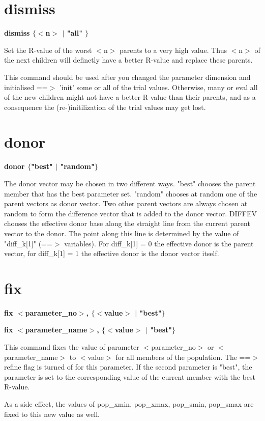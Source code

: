 \section{dismiss}
{\bf dismiss $ \{$$ <$n$> $ $| $ "all" $\} $ \par }
\par
\vspace{3pt}
Set the R-value of the worst $ <$n$> $ parents to a very high value. 
Thus $ <$n$> $ of the next children will definetly have a better R-value 
and replace these parents. 
\par
This command should be used after you changed the parameter dimension 
and initialised ==$> $ 'init' some or all of the trial values. 
Otherwise, many or eval all of the new children might not have 
a better R-value than their parents, and as a consequence the 
(re-)initilization of the trial values may get lost. 
\section{donor}
{\bf donor $ \{$"best" $| $ "random"$\} $ \par }
\par
\vspace{3pt}
The donor vector may be chosen in two different ways. 
"best" chooses the parent member that has the best parameter set. 
"random" chooses at random one of the parent vectors as donor vector. 
Two other parent vectors are always chosen at random to form the 
difference vector that is added to the donor vector. 
DIFFEV chooses the effective donor base along the straight line 
from the current parent vector to the donor. The point along this 
line is determined by the value of "diff\_k[1]" (==$> $ variables). 
For diff\_k[1] = 0  the effective donor is the parent vector, 
for diff\_k[1] = 1  the effective donor is the donor vector itself. 
\section{fix}
{\bf fix $ <$parameter\_no$> $, $ \{$$ <$value$> $ $| $ "best"$\} $ \par }
{\bf fix $ <$parameter\_name$> $, $ \{$$ <$value$> $ $| $ "best"$\} $ \par }
\par
\vspace{3pt}
This command fixes the value of parameter $ <$parameter\_no$> $ or 
$ <$parameter\_name$> $ to 
$ <$value$> $ for all members of the population. The ==$> $ refine 
flag is turned of for this parameter. 
If the second parameter is "best", the parameter is set to the 
corresponding value of the current member with the best R-value. 
\par
As a side effect, the values of pop\_xmin, pop\_xmax, 
pop\_smin, pop\_smax are fixed to this new value as well. 
